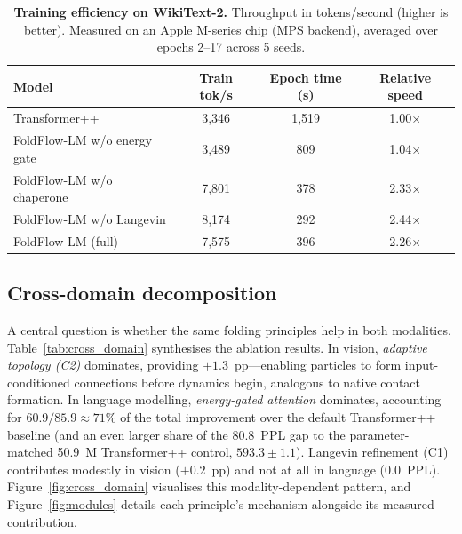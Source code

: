 \documentclass[fleqn,10pt]{article}
\begin{document}
\begin{table}[t]
\centering
\caption{\textbf{Training efficiency on WikiText-2.} Throughput in
tokens/second (higher is better). Measured on an Apple M-series chip
(MPS backend), averaged over epochs 2--17 across 5 seeds.}
\label{tab:throughput}
\small
\begin{tabular}{@{}lccc@{}}
\toprule
Model & Train tok/s & Epoch time (s) & Relative speed \\
\midrule
Transformer++              & 3{,}346 & 1{,}519 & 1.00$\times$ \\
FoldFlow-LM w/o energy gate & 3{,}489 & 809 & 1.04$\times$ \\
FoldFlow-LM w/o chaperone  & 7{,}801 & 378 & 2.33$\times$ \\
FoldFlow-LM w/o Langevin   & 8{,}174 & 292 & 2.44$\times$ \\
FoldFlow-LM (full)         & 7{,}575 & 396 & 2.26$\times$ \\
\bottomrule
\end{tabular}
\end{table}

\subsection*{Cross-domain decomposition}

A central question is whether the same folding principles help in
both modalities. Table~\ref{tab:cross_domain} synthesises the
ablation results. In vision, \emph{adaptive topology (C2)} dominates,
providing $+1.3$~pp---enabling particles to form input-conditioned
connections before dynamics begin, analogous to native contact
formation. In language modelling, \emph{energy-gated attention}
dominates, accounting for $60.9/85.9 \approx 71\%$ of the total
improvement over the default Transformer++ baseline (and an even
larger share of the $80.8$~PPL gap to the parameter-matched 50.9~M
Transformer++ control, $593.3 \pm 1.1$). Langevin refinement (C1)
contributes modestly in vision ($+0.2$~pp) and not at all in
language ($0.0$~PPL). Figure~\ref{fig:cross_domain} visualises this
modality-dependent pattern, and Figure~\ref{fig:modules} details each
principle's mechanism alongside its measured contribution.
\end{document}
